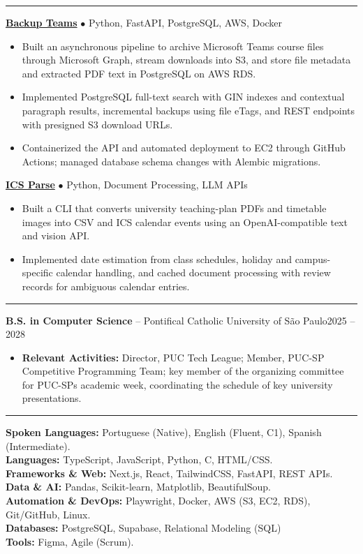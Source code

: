 \documentclass[10pt,letterpaper]{article}
\newcommand{\ressection}[1]{\par\vspace{6pt}{\large\bfseries #1}\par\vspace{2pt}\hrule\vspace{3pt}}
\begin{document}
\ressection{Projects}
\textbf{\href{https://github.com/raulkolaric/backup-teams}{Backup Teams}} $\bullet$ Python, FastAPI, PostgreSQL, AWS, Docker
\begin{itemize}
\item Built an asynchronous pipeline to archive Microsoft Teams course files through Microsoft Graph, stream downloads into S3, and store file metadata and extracted PDF text in PostgreSQL on AWS RDS.
\item Implemented PostgreSQL full-text search with GIN indexes and contextual paragraph results, incremental backups using file eTags, and REST endpoints with presigned S3 download URLs.
\item Containerized the API and automated deployment to EC2 through GitHub Actions; managed database schema changes with Alembic migrations.
\end{itemize}
\vspace{3pt}
\textbf{\href{https://github.com/raulkolaric/ics-parse}{ICS Parse}} $\bullet$ Python, Document Processing, LLM APIs
\begin{itemize}
\item Built a CLI that converts university teaching-plan PDFs and timetable images into CSV and ICS calendar events using an OpenAI-compatible text and vision API.
\item Implemented date estimation from class schedules, holiday and campus-specific calendar handling, and cached document processing with review records for ambiguous calendar entries.
\end{itemize}
\ressection{Education}
\textbf{B.S. in Computer Science} -- Pontifical Catholic University of São Paulo\hfill 2025 -- 2028
\begin{itemize}
\item \textbf{Relevant Activities:} Director, PUC Tech League; Member, PUC-SP Competitive Programming Team; key member of the organizing committee for PUC-SP\textquotesingle s academic week, coordinating the schedule of key university presentations.
\end{itemize}
\ressection{Technical Skills}
\textbf{Spoken Languages:} Portuguese (Native), English (Fluent, C1), Spanish (Intermediate).\\
\textbf{Languages:} TypeScript, JavaScript, Python, C, HTML/CSS.\\
\textbf{Frameworks \& Web:} Next.js, React, TailwindCSS, FastAPI, REST APIs.\\
\textbf{Data \& AI:} Pandas, Scikit-learn, Matplotlib, BeautifulSoup.\\
\textbf{Automation \& DevOps:} Playwright, Docker, AWS (S3, EC2, RDS), Git/GitHub, Linux.\\
\textbf{Databases:} PostgreSQL, Supabase, Relational Modeling (SQL)\\
\textbf{Tools:} Figma, Agile (Scrum).
\end{document}
